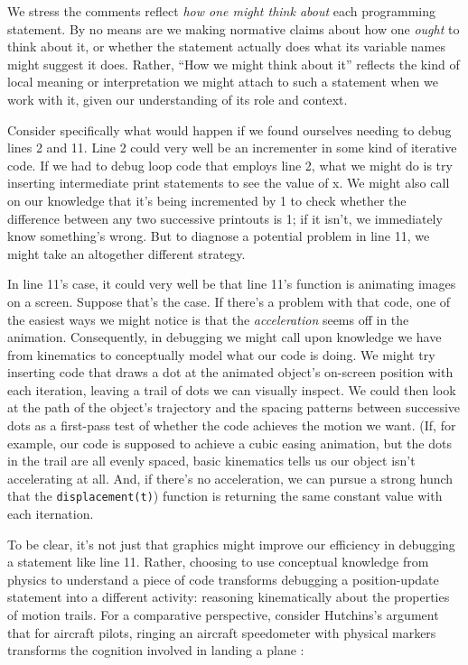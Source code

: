 We stress the comments reflect \emph{how one might think about}
each programming statement. By no means are we making normative
claims about how one \emph{ought} to think about it, or whether the
statement actually does what its variable names might suggest it does. Rather,
``How we might think about it'' reflects the kind of local meaning or
interpretation we might attach to such a statement when we work with it,
given our understanding of its role and context.

Consider specifically what would happen if we found ourselves needing to debug lines 2 and 11. Line 2 could very well be
an incrementer in some kind of iterative code. If we had to debug loop code
that employs line 2, what we might do is try inserting
intermediate print statements to see the value of x. We might also call on our knowledge that it's being incremented by 1 to check whether the difference between any two successive printouts is 1; if it isn't, we immediately know something's wrong. But to diagnose a potential problem in line 11, we might take an altogether different strategy.


In line
11's case, it could very well be that line 11's function is animating
images on a screen. Suppose that's the case. If there's a problem with that code, one of the
easiest ways we might notice is that the \emph{acceleration} seems off in the
animation. Consequently, in debugging we might call upon knowledge we have
from kinematics to conceptually model what our code is doing. We might try inserting code that draws a dot at the
animated object's on-screen position with each iteration, leaving a trail of dots we can
visually inspect. We could then look at the path of the object's
trajectory and the spacing patterns between successive dots as a
first-pass test of whether the code achieves the motion we want. (If, for example, our code is supposed to achieve a cubic easing animation, but the dots in the trail are all evenly spaced, basic kinematics tells us our object isn't accelerating at all. And, if there's no acceleration, we can pursue a strong hunch that the \texttt{displacement(t)}) function is returning the same constant value with each iternation.

To be clear, it's not just that graphics might improve our efficiency in
debugging a statement like line 11. Rather, choosing to
use conceptual knowledge from physics to understand a piece of code transforms debugging a position-update statement
into a different activity: reasoning kinematically about the properties of motion
trails. For a comparative perspective, consider Hutchins's argument that for aircraft pilots, ringing an aircraft speedometer with physical markers transforms the cognition involved in landing a plane \cite{hutchins_how_1995}:

